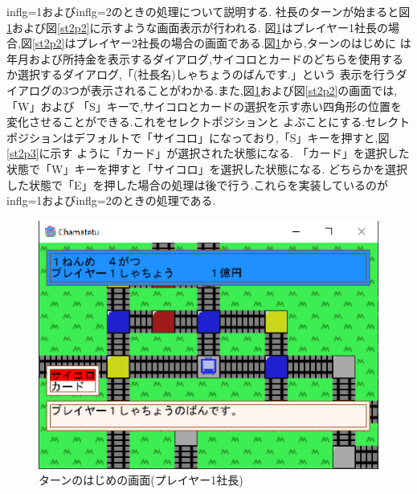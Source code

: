 \documentclass[a4j]{jarticle}
\begin{document}
    inflg=1およびinflg=2のときの処理について説明する. 社長のターンが始まると図\ref{st2p1}および図\ref{st2p2}に示すような画面表示が行われる.
    図\ref{st2p1}はプレイヤー1社長の場合,図\ref{st2p2}はプレイヤー2社長の場合の画面である.図\ref{st2p1}から,ターンのはじめに
    は年月および所持金を表示するダイアログ,サイコロとカードのどちらを使用するか選択するダイアログ,「(社長名)しゃちょうのばんです.」という
    表示を行うダイアログの3つが表示されることがわかる.また,図\ref{st2p1}および図\ref{st2p2}の画面では,「W」および
    「S」キーで,サイコロとカードの選択を示す赤い四角形の位置を変化させることができる.これをセレクトポジションと
    よぶことにする.セレクトポジションはデフォルトで「サイコロ」になっており,「S」キーを押すと,図\ref{st2p3}に示す
    ように「カード」が選択された状態になる. 「カード」を選択した状態で「W」キーを押すと「サイコロ」を選択した状態になる.
    どちらかを選択した状態で「E」を押した場合の処理は後で行う.これらを実装しているのがinflg=1およびinflg=2のときの処理である.

    \begin{figure}[H]
        \centering
        \includegraphics[scale=1.3]{st2p1.eps}
        \caption{ターンのはじめの画面(プレイヤー1社長)}
         \label{st2p1}
        \end{figure} 
\end{document}
